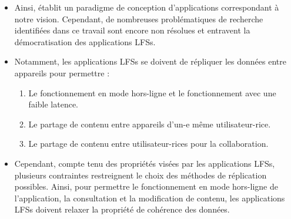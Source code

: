 \begin{itemize}
\begin{definition}[Collaborative]
      \end{definition}
    \item Ainsi, \cite{localfirstsoftware2019} établit un paradigme de conception d'applications correspondant à notre vision.
      Cependant, de nombreuses problématiques de recherche identifiées dans ce travail sont encore non résolues et entravent la démocratisation des applications \acp{LFS}.
    \item Notamment, les applications \acp{LFS} se doivent de répliquer les données entre appareils pour permettre :
      \begin{enumerate}
        \item Le fonctionnement en mode hors-ligne et le fonctionnement avec une faible latence.
        \item Le partage de contenu entre appareils d'un-e même utilisateur-rice.
        \item Le partage de contenu entre utilisateur-rices pour la collaboration.
      \end{enumerate}
    \item Cependant, compte tenu des propriétés visées par les applications \acp{LFS}, plusieurs contraintes restreignent le choix des méthodes de réplication possibles.
      Ainsi, pour permettre le fonctionnement en mode hors-ligne de l'application, \ie la consultation et la modification de contenu, les applications \acp{LFS} doivent relaxer la propriété de cohérence des données.
      \begin{definition}[Cohérence]


\end{definition}
\end{itemize}

